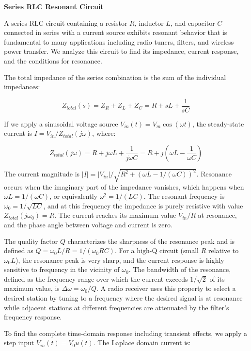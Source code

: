 \begin{example}
\textbf{Series RLC Resonant Circuit}

A series RLC circuit containing a resistor $R$, inductor $L$, and capacitor $C$ connected in series with a current source exhibits resonant behavior that is fundamental to many applications including radio tuners, filters, and wireless power transfer. We analyze this circuit to find its impedance, current response, and the conditions for resonance.

The total impedance of the series combination is the sum of the individual impedances:

\begin{equation}
Z_{total}(s) = Z_R + Z_L + Z_C = R + sL + \frac{1}{sC}
\end{equation}

If we apply a sinusoidal voltage source $V_{in}(t) = V_m \cos(\omega t)$, the steady-state current is $I = V_{in}/Z_{total}(j\omega)$, where:

\begin{equation}
Z_{total}(j\omega) = R + j\omega L + \frac{1}{j\omega C} = R + j\left(\omega L - \frac{1}{\omega C}\right)
\end{equation}

The current magnitude is $|I| = |V_{in}| / \sqrt{R^2 + (\omega L - 1/(\omega C))^2}$. Resonance occurs when the imaginary part of the impedance vanishes, which happens when $\omega L = 1/(\omega C)$, or equivalently $\omega^2 = 1/(LC)$. The resonant frequency is $\omega_0 = 1/\sqrt{LC}$, and at this frequency the impedance is purely resistive with value $Z_{total}(j\omega_0) = R$. The current reaches its maximum value $V_{in}/R$ at resonance, and the phase angle between voltage and current is zero.

The quality factor $Q$ characterizes the sharpness of the resonance peak and is defined as $Q = \omega_0 L / R = 1/(\omega_0 RC)$. For a high-Q circuit (small $R$ relative to $\omega_0 L$), the resonance peak is very sharp, and the current response is highly sensitive to frequency in the vicinity of $\omega_0$. The bandwidth of the resonance, defined as the frequency range over which the current exceeds $1/\sqrt{2}$ of its maximum value, is $\Delta\omega = \omega_0 / Q$. A radio receiver uses this property to select a desired station by tuning to a frequency where the desired signal is at resonance while adjacent stations at different frequencies are attenuated by the filter's frequency response.

To find the complete time-domain response including transient effects, we apply a step input $V_{in}(t) = V_0 u(t)$. The Laplace domain current is:


\end{example}
